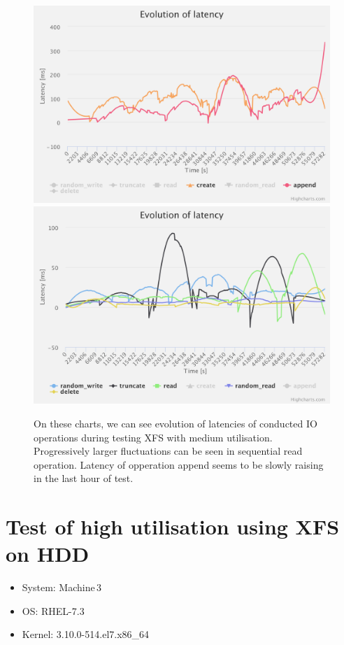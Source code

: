 \documentclass[
  color, %
  table, %
  lof,   %
  lot,   %
]{fithesis3}
\begin{document}
\begin{figure}[!htb]
    \centering
   \begin{minipage}{\textwidth}
        \centering
        \includegraphics[width=\textwidth]{../charts/HDD_xfs/low_ca}
        \includegraphics[width=\textwidth]{../charts/HDD_xfs/low_others}
        \caption[Evolution of latencies of XFS during testing of medium utilisation of HDD]{On these charts, we can see evolution of latencies of conducted IO operations during testing XFS with medium utilisation. Progressively larger fluctuations can be seen in sequential read operation. Latency of opperation append seems to be slowly raising in the last hour of test.}
\label{fig:lats80_xfs}
    \end{minipage}
\end{figure}

\clearpage

\section{Test of high utilisation using XFS on HDD}
\begin{itemize}
\itemsep0em 
   \item System: Machine\,3
   \item OS: RHEL-7.3
   \item Kernel: 3.10.0-514.el7.x86\_64
\end{itemize}
\end{document}
